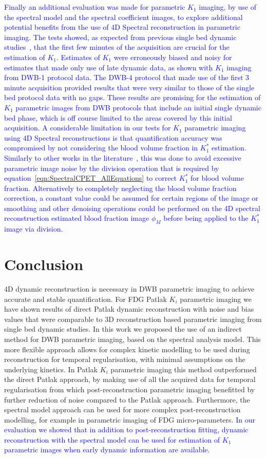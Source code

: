 \textcolor{blue}{
Finally an additional evaluation was made for parametric $K_1$ imaging, by use of the spectral model and the spectral coefficient images, to explore additional potential benefits from the use of 4D Spectral reconstruction in parametric imaging. The tests showed, as expected from previous single bed dynamic studies~\cite{Meikle1998}, that the first few minutes of the acquisition are crucial for the estimation of $K_1$. Estimates of $K_1$ were erroneously biased and noisy for estimates that made only use of late dynamic data, as shown with $K_1$ imaging from DWB-1 protocol data. The DWB-4 protocol that made use of the first 3 minute acquisition provided results that were very similar to those of the single bed protocol data with no gaps. These results are promising for the estimation of $K_1$ parametric images from DWB protocols that include an initial single dynamic bed phase, which is off course limited to the areas covered by this initial acquisition.
A considerable limitation in our tests for $K_1$ parametric imaging using 4D Spectral reconstructions is that quantification accuracy was compromised by not considering the blood volume fraction in $K_1^*$ estimation. Similarly to other works in the literature~\cite{Feng2021}, this was done to avoid excessive parametric image noise by the division operation that is required by equation~\ref{eqn:SpectralCPET_AllEquations} to correct $K_1^*$ for blood volume fraction. 
Alternatively to completely neglecting the blood volume fraction correction, a constant value could be assumed for certain regions of the image or smoothing and other denoising operations could be performed on the 4D spectral reconstruction estimated blood fraction image $\phi_M$ before being applied to the $K_1^*$ image via division.}

\section*{Conclusion}
4D dynamic reconstruction is necessary in DWB parametric imaging to achieve accurate and stable quantification. For FDG Patlak $K_i$ parametric imaging we have shown results of direct Patlak dynamic reconstruction with noise and bias values that were comparable to 3D reconstruction based parametric imaging from single bed dynamic studies. 
In this work we proposed the use of an indirect method for DWB parametric imaging, based on the spectral analysis model. This more flexible approach allows for complex kinetic modelling to be used during reconstruction for temporal regularisation, with minimal assumptions on the underlying kinetics. In Patlak $K_i$ parametric imaging this method outperformed the direct Patlak approach, by making use of all the acquired data for temporal regularisation from which post-reconstruction parametric imaging benefitted by further reduction of noise compared to the Patlak approach. Furthermore, the spectral model approach can be used for more complex post-reconstruction modelling, for example in parametric imaging of FDG micro-parameters.
\textcolor{blue}{In our evaluation we showed that in addition to post-reconstruction fitting, dynamic reconstruction with the spectral model can be used for estimation of $K_1$ parametric images when early dynamic information are available.}

